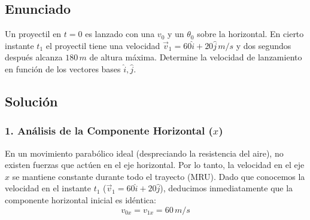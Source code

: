 \documentclass[12pt, a4paper]{article}
\begin{document}
\newpage

\subsection*{Enunciado}
Un proyectil en $t = 0$ es lanzado con una $v_0$ y un $\theta_0$ sobre la horizontal. En cierto instante $t_1$ el proyectil tiene una velocidad $\vec{v}_1 = 60\hat{i} + 20\hat{j} \, \si{m/s}$ y dos segundos después alcanza $180 \, \si{m}$ de altura máxima. Determine la velocidad de lanzamiento en función de los vectores bases $\hat{i}, \hat{j}$.

\begin{center}
\end{center}

\subsection*{Solución}

\subsubsection*{1. Análisis de la Componente Horizontal ($x$)}
En un movimiento parabólico ideal (despreciando la resistencia del aire), no existen fuerzas que actúen en el eje horizontal. Por lo tanto, la velocidad en el eje $x$ se mantiene constante durante todo el trayecto (MRU).
Dado que conocemos la velocidad en el instante $t_1$ ($\vec{v}_1 = 60\hat{i} + 20\hat{j}$), deducimos inmediatamente que la componente horizontal inicial es idéntica:
$$ v_{0x} = v_{1x} = 60 \, \si{m/s} $$
\end{document}
